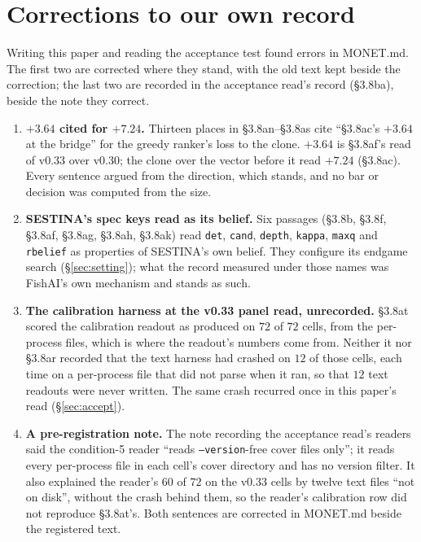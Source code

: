 \documentclass[11pt]{article}
\newcommand{\code}[1]{\texttt{#1}}
\newcommand{\monet}{MONET.md}
\newcommand{\sect}[1]{\S#1}
\begin{document}
\section{Corrections to our own record}
\label{sec:errata}

Writing this paper and reading the acceptance test found errors in \monet{}. The first two are
corrected where they stand, with the old text kept beside the correction; the last two are recorded
in the acceptance read's record (\sect{3.8ba}), beside the note they correct.

\begin{enumerate}
  \item \textbf{$+3.64$ cited for $+7.24$.} Thirteen places in \sect{3.8an}--\sect{3.8as} cite
        ``\sect{3.8ac}'s $+3.64$ at the bridge'' for the greedy ranker's loss to the clone. $+3.64$ is
        \sect{3.8af}'s read of v0.33 over v0.30; the clone over the vector before it read $+7.24$
        (\sect{3.8ac}). Every sentence argued from the direction, which stands, and no bar or decision
        was computed from the size.
  \item \textbf{SESTINA's spec keys read as its belief.} Six passages (\sect{3.8b}, \sect{3.8f},
        \sect{3.8af}, \sect{3.8ag}, \sect{3.8ah}, \sect{3.8ak}) read \code{det}, \code{cand},
        \code{depth}, \code{kappa}, \code{maxq} and \code{rbelief} as properties of SESTINA's own
        belief. They configure its endgame search (\sect\ref{sec:setting}); what the record measured
        under those names was FishAI's own mechanism and stands as such.
  \item \textbf{The calibration harness at the v0.33 panel read, unrecorded.} \sect{3.8at} scored the
        calibration readout as produced on $72$ of $72$ cells, from the per-process files, which is
        where the readout's numbers come from. Neither it nor \sect{3.8ar} recorded that the text
        harness had crashed on $12$ of those cells, each time on a per-process file that did not parse
        when it ran, so that $12$ text readouts were never written. The same crash recurred once in this
        paper's read (\sect\ref{sec:accept}).
  \item \textbf{A pre-registration note.} The note recording the acceptance read's readers said the
        condition-5 reader ``reads \code{--version}-free cover files only''; it reads every per-process
        file in each cell's cover directory and has no version filter. It also explained the reader's
        $60$ of $72$ on the v0.33 cells by twelve text files ``not on disk'', without the crash behind
        them, so the reader's calibration row did not reproduce \sect{3.8at}'s. Both sentences are
        corrected in \monet{} beside the registered text.
\end{enumerate}
\end{document}
